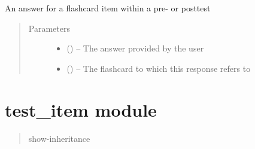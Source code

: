 \documentclass[letterpaper,10pt,english]{sphinxmanual}
\begin{document}
\begin{fulllineitems}
\label{\detokenize{test_flashcard_response:test_flashcard_response.TestFlashcardResponse}}
An answer for a flashcard item within a pre- or posttest
\begin{quote}\begin{description}
\item[{Parameters}] \leavevmode\begin{itemize}
\item {} 
 () -- The answer provided by the user

\item {} 
 () -- The flashcard to which this response refers to

\end{itemize}

\end{description}\end{quote}

\end{fulllineitems}



\chapter{test\_item module}
\label{\detokenize{test_item::doc}}\label{\detokenize{test_item:module-test_item}}\label{\detokenize{test_item:test-item-module}}\begin{quote}\begin{description}
\item[{show-inheritance}] \leavevmode
\end{description}\end{quote}
\end{document}
